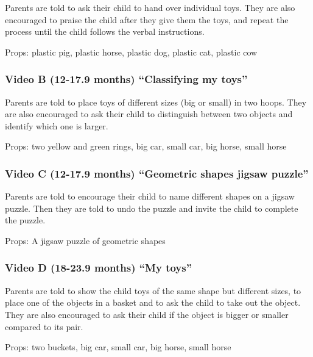 \documentclass[man,floatsintext]{apa6}
\begin{document}
\begin{appendix}
Parents are told to ask their child to hand over individual toys. They
are also encouraged to praise the child after they give them the toys,
and repeat the process until the child follows the verbal instructions.

Props: plastic pig, plastic horse, plastic dog, plastic cat, plastic cow

\hypertarget{video-b-12-17.9-months-classifying-my-toys}{%
\subsubsection{Video B (12-17.9 months) ``Classifying my
toys''}\label{video-b-12-17.9-months-classifying-my-toys}}

Parents are told to place toys of different sizes (big or small) in two
hoops. They are also encouraged to ask their child to distinguish
between two objects and identify which one is larger.

Props: two yellow and green rings, big car, small car, big horse, small
horse

\hypertarget{video-c-12-17.9-months-geometric-shapes-jigsaw-puzzle}{%
\subsubsection{Video C (12-17.9 months) ``Geometric shapes jigsaw
puzzle''}\label{video-c-12-17.9-months-geometric-shapes-jigsaw-puzzle}}

Parents are told to encourage their child to name different shapes on a
jigsaw puzzle. Then they are told to undo the puzzle and invite the
child to complete the puzzle.

Props: A jigsaw puzzle of geometric shapes

\hypertarget{video-d-18-23.9-months-my-toys}{%
\subsubsection{Video D (18-23.9 months) ``My
toys''}\label{video-d-18-23.9-months-my-toys}}

Parents are told to show the child toys of the same shape but different
sizes, to place one of the objects in a basket and to ask the child to
take out the object. They are also encouraged to ask their child if the
object is bigger or smaller compared to its pair.

Props: two buckets, big car, small car, big horse, small horse

\hypertarget{video-e-18-23.9-months-the-orchestra}{%
}
\end{appendix}
\end{document}
